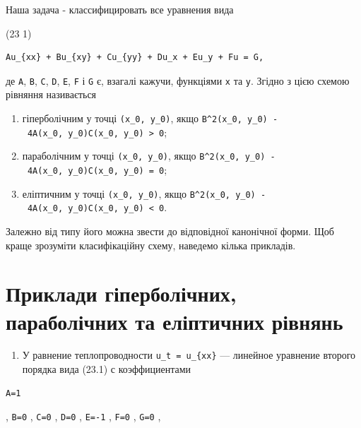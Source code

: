 \documentclass[
  ukrainian,
]{article}
\providecommand{\tightlist}{%
  \setlength{\itemsep}{0pt}\setlength{\parskip}{0pt}}
\begin{document}
Наша задача - классифицировать все уравнения вида

(23 1)

\begin{verbatim}
Au_{xx} + Bu_{xy} + Cu_{yy} + Du_x + Eu_y + Fu = G,
\end{verbatim}

де \texttt{A}, \texttt{B}, \texttt{C}, \texttt{D}, \texttt{E},
\texttt{F} і \texttt{G} є, взагалі кажучи, функціями \texttt{x} та
\texttt{y}. Згідно з цією схемою рівняння називається

\begin{enumerate}
\def\labelenumi{\arabic{enumi}.}
\tightlist
\item
  гіперболічним у точці \texttt{(x\_0,\ y\_0)}, якщо
  \texttt{B\^{}2(x\_0,\ y\_0)\ -\ 4A(x\_0,\ y\_0)C(x\_0,\ y\_0)\ \textgreater{}\ 0};
\item
  параболічним у точці \texttt{(x\_0,\ y\_0)}, якщо
  \texttt{B\^{}2(x\_0,\ y\_0)\ -\ 4A(x\_0,\ y\_0)C(x\_0,\ y\_0)\ =\ 0};
\item
  еліптичним у точці \texttt{(x\_0,\ y\_0)}, якщо
  \texttt{B\^{}2(x\_0,\ y\_0)\ -\ 4A(x\_0,\ y\_0)C(x\_0,\ y\_0)\ \textless{}\ 0}.
\end{enumerate}

Залежно від типу його можна звести до відповідної канонічної форми. Щоб
краще зрозуміти класифікаційну схему, наведемо кілька прикладів.

\section{Приклади гіперболічних, параболічних та еліптичних
рівнянь}\label{ux43fux440ux438ux43aux43bux430ux434ux438-ux433ux456ux43fux435ux440ux431ux43eux43bux456ux447ux43dux438ux445-ux43fux430ux440ux430ux431ux43eux43bux456ux447ux43dux438ux445-ux442ux430-ux435ux43bux456ux43fux442ux438ux447ux43dux438ux445-ux440ux456ux432ux43dux44fux43dux44c}

\begin{enumerate}
\def\labelenumi{\arabic{enumi}.}
\tightlist
\item
  У равнение теплопроводности \texttt{u\_t\ =\ u\_\{xx\}} --- линейное
  уравнение второго порядка вида (23.1) с коэффициентами
\end{enumerate}

\begin{verbatim}
A=1
\end{verbatim}

, \texttt{B=0} , \texttt{C=0} , \texttt{D=0} , \texttt{E=-1} ,
\texttt{F=0} , \texttt{G=0} ,
\end{document}
